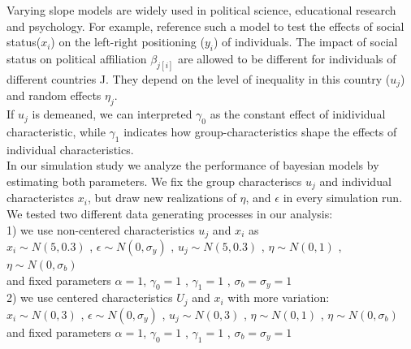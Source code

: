 Varying slope models are widely used in political science, educational research and psychology. For example, \cite{snijders2012} reference such a model to test the effects of social status($x_i$) on the left-right positioning ($y_i$) of individuals. The impact of social status on political affiliation $\beta_{j[i]}$ are allowed to be different for individuals of different countries J. They depend on the level of inequality in this country ($u_j$)  and random effects $\eta_j$.\\
If $u_j$ is demeaned, we can interpreted $\gamma_0$  as the constant effect of inidividual characteristic, while $\gamma_1$ indicates how group-characteristics shape the effects of individual characteristics.\\
In our simulation study we analyze the performance of bayesian models by estimating both parameters. We fix the group characteriscs $u_j$ and individual characteristcs $x_i$, but draw new realizations of  $\eta$, and $\epsilon$ in every simulation run. \\

We tested two different data generating processes in our analysis: \\

1) we use non-centered characteristics $u_j$ and $x_i$ as\\

$x_i \sim N(5,0.3)$ , $\epsilon \sim N(0,\sigma_y) $ , $u_j \sim N(5,0.3)$ , $\eta \sim N(0,1) $ , $\eta \sim N(0,\sigma_b)$\\
and fixed parameters $\alpha=1$, $\gamma_0=1$ , $\gamma_1=1$ , $\sigma_b=\sigma_y=1$\\

2) we use centered characteristics $U_j$ and $x_i$ with more variation: \\ 

$x_i \sim N(0,3)$ ,  $\epsilon \sim N(0,\sigma_y) $ , $u_j \sim N(0,3)$ , $\eta \sim N(0,1) $ , $\eta \sim N(0,\sigma_b)$\\
and fixed parameters $\alpha=1$, $\gamma_0=1$ , $\gamma_1=1$ , $\sigma_b=\sigma_y=1$ \\

